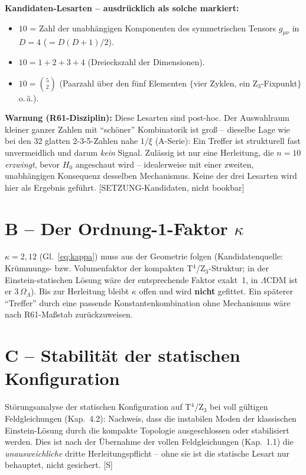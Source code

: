 \documentclass[11pt]{report}
\begin{document}
\textbf{Kandidaten-Lesarten -- ausdrücklich als solche markiert:}
\begin{itemize}
  \item $10$ = Zahl der unabhängigen Komponenten des symmetrischen
        Tensors $g_{\mu\nu}$ in $D=4$ ($= D(D{+}1)/2$).
  \item $10 = 1+2+3+4$ (Dreieckszahl der Dimensionen).
  \item $10 = \binom{5}{2}$ (Paarzahl über den fünf Elementen
        $\{$vier Zyklen, ein Z$_3$-Fixpunkt$\}$ o.\,ä.).
\end{itemize}

\textbf{Warnung (R61-Disziplin):} Diese Lesarten sind post-hoc.
Der Auswahlraum kleiner ganzer Zahlen mit \enquote{schöner}
Kombinatorik ist groß -- dieselbe Lage wie bei den 32 glatten
2-3-5-Zahlen nahe $1/\xi$ (A-Serie): Ein Treffer ist strukturell
fast unvermeidlich und darum \emph{kein} Signal. Zulässig ist nur
eine Herleitung, die $n=10$ \emph{erzwingt}, bevor $H_0$ angeschaut
wird -- idealerweise mit einer zweiten, unabhängigen Konsequenz
desselben Mechanismus. Keine der drei Lesarten wird hier als
Ergebnis geführt. [SETZUNG-Kandidaten, nicht bookbar]

\section{B -- Der Ordnung-1-Faktor $\kappa$}

$\kappa = 2{,}12$ (Gl.~\eqref{eq:kappa}) muss aus der Geometrie
folgen (Kandidatenquelle: Krümmungs- bzw. Volumenfaktor der
kompakten T$^4$/Z$_3$-Struktur; in der Einstein-statischen Lösung
wäre der entsprechende Faktor exakt~1, in $\Lambda$CDM ist er
$3\,\Omega_\Lambda$). Bis zur Herleitung bleibt $\kappa$ offen und
wird \textbf{nicht} gefittet. Ein späterer \enquote{Treffer} durch
eine passende Konstantenkombination ohne Mechanismus wäre nach
R61-Maßstab zurückzuweisen.

\section{C -- Stabilität der statischen Konfiguration}

Störungsanalyse der statischen Konfiguration auf T$^4$/Z$_3$ bei
voll gültigen Feldgleichungen (Kap.~4.2): Nachweis, dass die
instabilen Moden der klassischen Einstein-Lösung durch die kompakte
Topologie ausgeschlossen oder stabilisiert werden. Dies ist nach der
Übernahme der vollen Feldgleichungen (Kap.~1.1) die
\emph{unausweichliche} dritte Herleitungspflicht -- ohne sie ist
die statische Lesart nur behauptet, nicht gesichert. [S]
\end{document}
